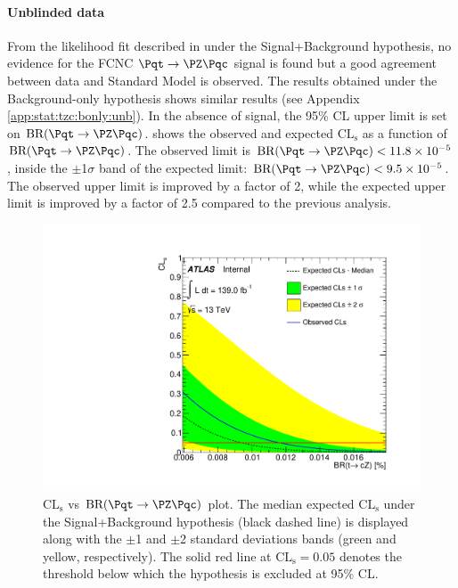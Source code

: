 \paragraph {Unblinded data}
From the likelihood fit described in  under the Signal+Background hypothesis, no evidence for the FCNC $\mathrm{\Pqt\rightarrow\PZ\Pqc}$ signal is found but a good agreement between data and Standard Model is observed. The results obtained under the Background-only hypothesis shows similar results (see Appendix \ref{app:stat:tzc:bonly:unb}).
In the absence of signal, the 95\% CL upper limit is set on $\mathrm{BR (\Pqt\rightarrow\PZ\Pqc)}$.
 shows the observed and expected $\mathrm{CL_{s}}$ as a function of $\mathrm{BR (\Pqt\rightarrow\PZ\Pqc)}$. The observed limit is $\mathrm{BR (\Pqt\rightarrow\PZ\Pqc)}<11.8\times 10^{-5}$, inside the $\pm$1$\sigma$ band of the expected limit: $\mathrm{BR (\Pqt\rightarrow\PZ\Pqc)}<9.5\times 10^{-5}$.
The observed upper limit is improved by a factor of 2, while the expected upper limit is improved by a factor of 2.5 compared to the previous analysis.
\begin{figure}[htbp]
	\centering
	\includegraphics[width=.8\textwidth]{Chapters/CH8/figures/SPLUSB_CRSR_DL1rc_unblind/CLsPlot}
	\caption{$\mathrm{CL_{s}}$ vs $\mathrm{BR (\Pqt\rightarrow\PZ\Pqc)}$ plot. The median expected $\mathrm{CL_{s}}$ under the Signal+Background hypothesis
(black dashed line) is displayed along with the $\pm$1 and $\pm$2 standard deviations bands
(green and yellow, respectively). The solid red line at $\mathrm{CL_{s}= 0.05}$ denotes the threshold below
which the hypothesis is excluded at 95\% CL.}
	\label{fig:stat:tzc:splusb:crsr:CLsPlot}
\end{figure}

